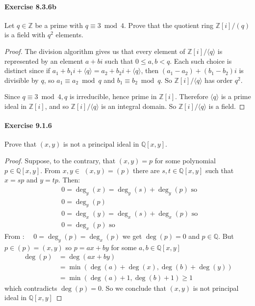 \documentclass{article}
\theoremstyle{definition}
\begin{document}
\paragraph{Exercise 8.3.6b} Let $q \in \mathbb{Z}$ be a prime with $q \equiv 3 \bmod 4$. Prove that the quotient ring $\mathbb{Z}[i] /(q)$ is a field with $q^{2}$ elements.
\begin{proof}
    The division algorithm gives us that every element of $\mathbb{Z}[i] /\langle q\rangle$ is represented by an element $a+b i$ such that $0 \leq a, b<q$. Each such choice is distinct since if $a_1+b_1 i+\langle q\rangle=a_2+b_2 i+\langle q\rangle$, then $\left(a_1-a_2\right)+\left(b_1-b_2\right) i$ is divisible by $q$, so $a_1 \equiv a_2 \bmod q$ and $b_1 \equiv b_2 \bmod q$. So $\mathbb{Z}[i] /\langle q\rangle$ has order $q^2$.

Since $q \equiv 3 \bmod 4, q$ is irreducible, hence prime in $\mathbb{Z}[i]$. Therefore $\langle q\rangle$ is a prime ideal in $\mathbb{Z}[i]$, and so $\mathbb{Z}[i] /\langle q\rangle$ is an integral domain. So $\mathbb{Z}[i] /\langle q\rangle$ is a field.
\end{proof}



\paragraph{Exercise 9.1.6} Prove that $(x, y)$ is not a principal ideal in $\mathbb{Q}[x, y]$.
\begin{proof}
    Suppose, to the contrary, that $(x, y)=p$ for some polynomial $p \in \mathbb{Q}[x, y]$. From $x, y \in$ $(x, y)=(p)$ there are $s, t \in \mathbb{Q}[x, y]$ such that $x=s p$ and $y=t p$.
Then:
$$
\begin{aligned}
& 0=\operatorname{deg}_y(x)=\operatorname{deg}_y(s)+\operatorname{deg}_y(p) \text { so } \\
& 0=\operatorname{deg}_y(p) \\
& 0=\operatorname{deg}_x(y)=\operatorname{deg}_x(s)+\operatorname{deg}_x(p) \text { so } \\
& 0=\operatorname{deg}_x(p) \text { so }
\end{aligned}
$$
From : $\quad 0=\operatorname{deg}_y(p)=\operatorname{deg}_x(p)$ we get $\operatorname{deg}(p)=0$ and $p \in \mathbb{Q}$.
But $p \in(p)=(x, y)$ so $p=a x+b y$ for some $a, b \in \mathbb{Q}[x, y]$
$$
\begin{aligned}
\operatorname{deg}(p) & =\operatorname{deg}(a x+b y) \\
& =\min (\operatorname{deg}(a)+\operatorname{deg}(x), \operatorname{deg}(b)+\operatorname{deg}(y)) \\
& =\min (\operatorname{deg}(a)+1, \operatorname{deg}(b)+1) \geqslant 1
\end{aligned}
$$
which contradicts $\operatorname{deg}(p)=0$.
So we conclude that $(x, y)$ is not principal ideal in $\mathbb{Q}[x, y]$
\end{proof}
\end{document}
